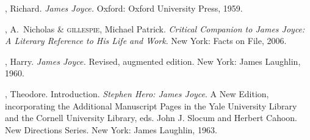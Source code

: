 \begin{bibliohedra}

, Richard.  \textit{James Joyce.}  Oxford: Oxford University
Press, 1959.

, A.~Nicholas \& \textsc{gillespie}, Michael Patrick. 
\textit{Critical Companion to James Joyce: A Literary Reference to His Life and Work}.
New York: Facts on File, 2006.

, Harry.  \textit{James Joyce.}  Revised, augmented edition.  New
York: James Laughlin, 1960.

, Theodore.  Introduction.  \textit{Stephen Hero: James Joyce}. 
A New Edition, incorporating the Additional Manuscript Pages in the Yale
University Library and the Cornell University Library, eds. John J.
Slocum and Herbert Cahoon.  New Directions Series.  New York: James
Laughlin, 1963.

\end{bibliohedra}